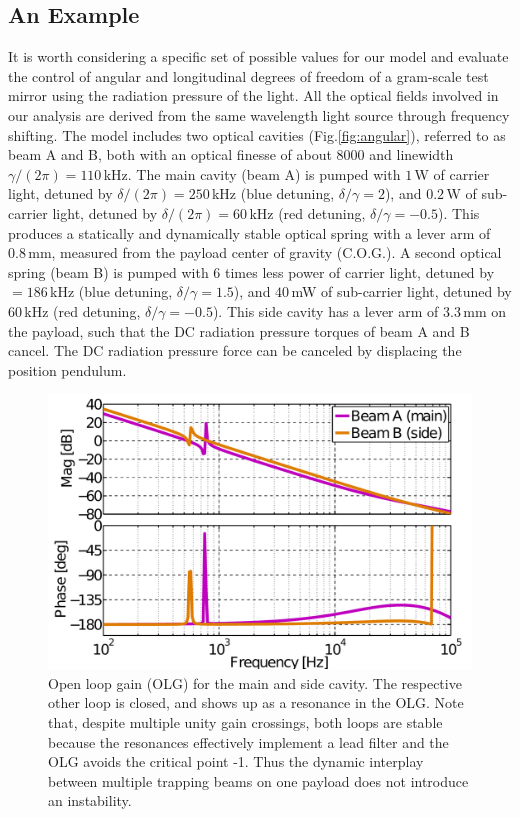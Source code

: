

\subsection{An Example}

It is worth considering a specific set of possible values for our model and evaluate the control of  angular and longitudinal degrees of freedom of a gram-scale test mirror using the radiation pressure of the light.
All the optical fields involved in our analysis are derived from the same wavelength light source through frequency shifting.
The model includes two optical cavities (Fig.\ref{fig:angular}), referred to as beam A and B, both with an optical finesse of  about $8000$ and linewidth $\gamma/(2 \pi) = 110\,$kHz. 
The main cavity (beam A) is pumped with $1\,$W of carrier light, detuned by $\delta/(2 \pi)= 250\,$kHz (blue detuning, $\delta/\gamma = 2$), and $0.2\,$W of sub-carrier light, detuned by $\delta/(2 \pi) =60\,$kHz (red detuning, $\delta/\gamma = -0.5$). This produces a statically and dynamically stable optical spring with a lever arm of $0.8\,$mm, measured from the payload center of gravity (C.O.G.). A second optical spring (beam B) is pumped with 6 times less power of carrier light, detuned by $=186\,$kHz (blue detuning, $\delta/\gamma=1.5$), and $40\,$mW of sub-carrier light, detuned by $60\,$kHz (red detuning, $\delta/\gamma=-0.5$). This side cavity has a lever arm of $3.3\,$mm on the payload, such that the DC radiation pressure torques of beam A and B cancel. The DC radiation pressure force can be canceled by displacing the position pendulum.

\begin{figure}[htbp]
	\centering
		\includegraphics[width=15cm]{./figures/open_loops_TF_paper2.pdf}%
	\caption[Open Loop Gain for Optical Trap Cavities]{Open loop gain (OLG) for the main and side cavity.	The respective other loop is closed, and shows up as a resonance in the OLG. Note that, despite multiple unity gain crossings, both loops are stable because the resonances effectively implement a lead filter and the OLG avoids the critical point -1. Thus the dynamic interplay between multiple trapping beams on one payload does not introduce an instability.}
	\label{fig:control_loops}
\end{figure}


